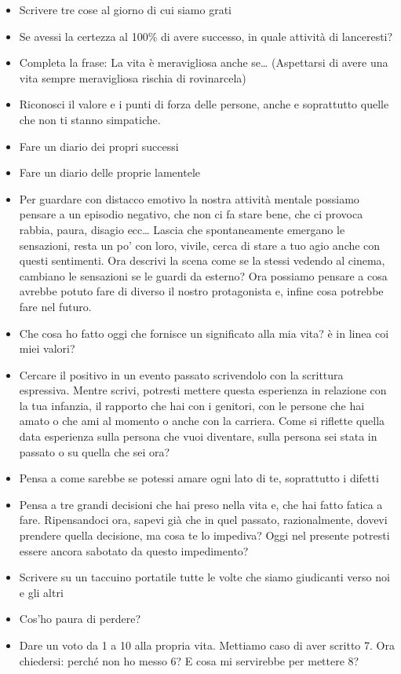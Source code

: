 \documentclass[12pt]{book} %
\begin{document}
\begin{itemize}
\item Scrivere tre cose al giorno di cui siamo grati
\item Se avessi la certezza al 100\% di avere successo, in quale attività di lanceresti?
\item Completa la frase: La vita è meravigliosa anche se… (Aspettarsi di avere una vita sempre meravigliosa rischia di rovinarcela)
\item Riconosci il valore e i punti di forza delle persone, anche e soprattutto quelle che non ti stanno simpatiche. 
\item Fare un diario dei propri successi 
\item Fare un diario delle proprie lamentele 
\item Per guardare con distacco emotivo la nostra attività mentale possiamo pensare a un episodio negativo, che non ci fa stare bene, che ci provoca rabbia, paura, disagio ecc… Lascia che spontaneamente emergano le sensazioni, resta un po' con loro, vivile, cerca di stare a tuo agio anche con questi sentimenti. Ora descrivi la scena come se la stessi vedendo al cinema, cambiano le sensazioni se le guardi da esterno? Ora possiamo pensare a cosa avrebbe potuto fare di diverso il nostro protagonista e, infine cosa potrebbe fare nel futuro.
\item Che cosa ho fatto oggi che fornisce un significato alla mia vita? è in linea coi miei valori? 
\item Cercare il positivo in un evento passato scrivendolo con la scrittura espressiva. Mentre scrivi, potresti mettere
questa esperienza in relazione con la tua infanzia, il rapporto che hai con i genitori, con le persone che hai amato o
che ami al momento o anche con la carriera. Come si riflette quella data esperienza sulla persona che vuoi diventare,
sulla persona sei stata in passato o su quella che sei ora?
\item Pensa a come sarebbe se potessi amare ogni lato di te, soprattutto i difetti
\item Pensa a tre grandi decisioni che hai preso nella vita e, che hai fatto fatica a fare. Ripensandoci ora, sapevi già
che in quel passato, razionalmente, dovevi prendere quella decisione, ma cosa te lo impediva? Oggi nel presente
potresti essere ancora sabotato da questo impedimento?
\item Scrivere su un taccuino portatile tutte le volte che siamo giudicanti verso noi e gli altri
\item Cos'ho paura di perdere?
\item Dare un voto da 1 a 10 alla propria vita. Mettiamo caso di aver scritto 7. Ora chiedersi: perché non ho messo 6? E
cosa mi servirebbe per mettere 8? 
\end{itemize}
\end{document}
